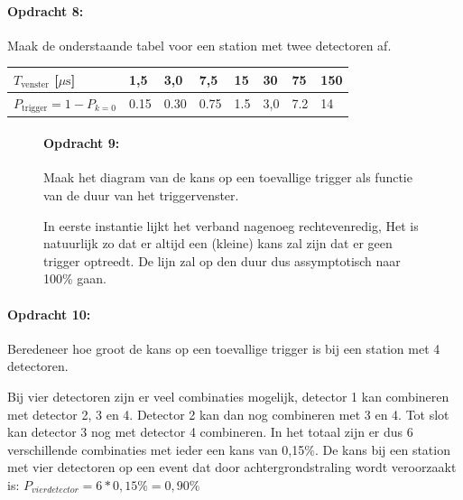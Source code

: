 \bigskip{}

\begin{minipage}[t]{1\columnwidth}%

\paragraph{Opdracht 8:}

Maak de onderstaande tabel voor een station met twee detectoren
af.

\bigskip{}

\begin{tabular}{|x{.20\textwidth}|x{.07\textwidth}|x{.07\textwidth}
                |x{.07\textwidth}|x{.07\textwidth}|x{.07\textwidth}
                |x{.07\textwidth}|x{.07\textwidth}|}
    \hline 
    $T_\textrm{venster}$ {[}$\mu\mathrm{s}${]} & 1,5 & 3,0 & 7,5 & 15 & 30 & 75 & 150\tabularnewline
    \hline 
    $P_\textrm{trigger}=1-P_{k=0}$ & 0.15  & 0.30 & 0.75 & 1.5 & 3,0 & 7.2 & 14\tabularnewline
    \hline 
\end{tabular}
\end{minipage}

\bigskip{}


\begin{figure}[h]

\paragraph{Opdracht 9:}

Maak het diagram van de kans op een toevallige trigger als
functie van de duur van het triggervenster.\bigskip{}

In eerste instantie lijkt het verband nagenoeg rechtevenredig, Het
is natuurlijk zo dat er altijd een (kleine) kans zal zijn dat er geen
trigger optreedt. De lijn zal op den duur dus assymptotisch naar 100\%
gaan.
\end{figure}


\bigskip{}


\begin{minipage}[t]{1\columnwidth}%

\paragraph{Opdracht 10:}

Beredeneer hoe groot de kans op een toevallige trigger is
bij een station met 4 detectoren.

\bigskip{}

Bij vier detectoren zijn er veel combinaties mogelijk, detector 1
kan combineren met detector 2, 3 en 4. Detector 2 kan dan nog combineren
met 3 en 4. Tot slot kan detector 3 nog met detector 4 combineren.
In het totaal zijn er dus 6 verschillende combinaties met ieder een
kans van 0,15\%. De kans bij een station met vier detectoren op een
event dat door achtergrondstraling wordt veroorzaakt is: $P_{vierdetector}=6*0,15\%=0,90\%$%
\end{minipage}


